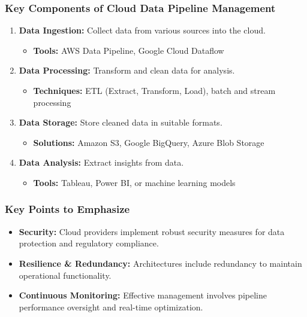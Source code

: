 \documentclass[aspectratio=169]{beamer}
\begin{document}
\begin{frame}[fragile]
    \frametitle{Key Components of Cloud Data Pipeline Management}
    \begin{enumerate}
        \item \textbf{Data Ingestion:} Collect data from various sources into the cloud.
        \begin{itemize}
            \item \textbf{Tools:} AWS Data Pipeline, Google Cloud Dataflow
        \end{itemize}
        \item \textbf{Data Processing:} Transform and clean data for analysis.
        \begin{itemize}
            \item \textbf{Techniques:} ETL (Extract, Transform, Load), batch and stream processing
        \end{itemize}
        \item \textbf{Data Storage:} Store cleaned data in suitable formats.
        \begin{itemize}
            \item \textbf{Solutions:} Amazon S3, Google BigQuery, Azure Blob Storage
        \end{itemize}
        \item \textbf{Data Analysis:} Extract insights from data.
        \begin{itemize}
            \item \textbf{Tools:} Tableau, Power BI, or machine learning models
        \end{itemize}
    \end{enumerate}
\end{frame}

\begin{frame}[fragile]
    \frametitle{Key Points to Emphasize}
    \begin{itemize}
        \item \textbf{Security:} Cloud providers implement robust security measures for data protection and regulatory compliance.
        \item \textbf{Resilience \& Redundancy:} Architectures include redundancy to maintain operational functionality.
        \item \textbf{Continuous Monitoring:} Effective management involves pipeline performance oversight and real-time optimization.
    \end{itemize}
\end{frame}
\end{document}
